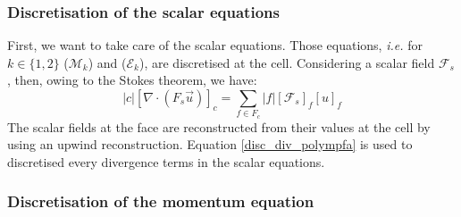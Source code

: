 \subsubsection{Discretisation of the scalar equations}
First, we want to take care of the scalar equations. Those equations, \textit{i.e.} for $k\in \{1,2\} $ ($\mathcal{M}_k$) and ($\mathcal{E}_k$), are discretised at the cell. Considering a scalar field $\mathcal{F}_s$, then, owing to the Stokes theorem, we have:
\begin{equation}
    |c| [\nabla \cdot (F_s \vec{u})]_c = \sum _{f \in F_c} |f| [\mathcal{F}_s]_f [u]_f \label{disc_div_polympfa}
\end{equation}
The scalar fields at the face are reconstructed from their values at the cell by using an upwind reconstruction. Equation \eqref{disc_div_polympfa} is used to discretised every divergence terms in the scalar equations. 

\subsubsection*{Discretisation of the momentum equation}

